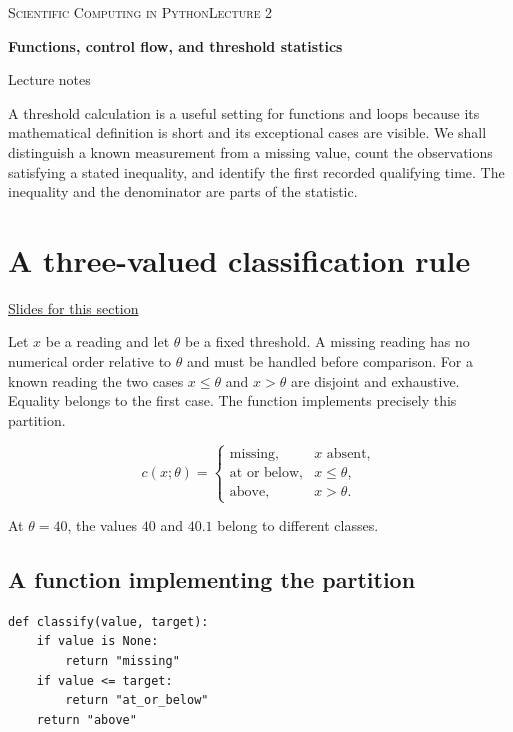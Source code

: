 \documentclass[11pt,letterpaper]{article}
\theoremstyle{definition}\newtheorem{definition}{Definition}\newtheorem{example}{Example}
\numberwithin{equation}{section}
\begin{document}
{\small\scshape Scientific Computing in Python\hfill Lecture 2}\par\medskip
{\raggedright{}\LARGE\bfseries\color{ink} Functions, control flow, and threshold statistics\par}\medskip
{\small Lecture notes}\par\bigskip
A threshold calculation is a useful setting for functions and loops because its mathematical definition is short and its exceptional cases are visible. We shall distinguish a known measurement from a missing value, count the observations satisfying a stated inequality, and identify the first recorded qualifying time. The inequality and the denominator are parts of the statistic.

\section{A three-valued classification rule}
\hypertarget{note-a-three-valued-classification-rule}{}\label{note:a-three-valued-classification-rule}
{\small \href{slides.html\#frame=a-three-valued-classification-rule\&step=1}{Slides for this section}}\par
Let $x$ be a reading and let $\theta$ be a fixed threshold. A missing reading has no numerical order relative to $\theta$ and must be handled before comparison. For a known reading the two cases $x\leq\theta$ and $x>\theta$ are disjoint and exhaustive. Equality belongs to the first case. The function implements precisely this partition.

\[
c(x;\theta)=\begin{cases}\text{missing},&x\text{ absent},\\\text{at or below},&x\leq\theta,\\\text{above},&x>\theta.\end{cases}
\]

At $\theta=40$, the values $40$ and $40.1$ belong to different classes.

\subsection*{A function implementing the partition}
\begin{minipage}{\linewidth}
\begin{verbatim}
def classify(value, target):
    if value is None:
        return "missing"
    if value <= target:
        return "at_or_below"
    return "above"
\end{verbatim}
\end{minipage}
\end{document}
